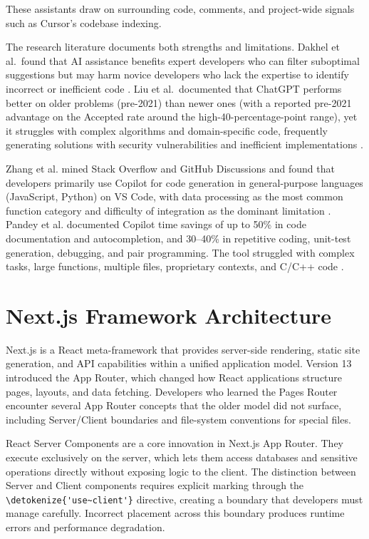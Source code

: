\documentclass[12pt,a4paper]{report}
\newcommand{\code}[1]{\texttt{\nolinkurl{\detokenize{#1}}}}
\newcommand{\usec}{\code{'use~client'}}
\begin{document}
These assistants draw on surrounding code, comments, and project-wide signals such as Cursor's codebase indexing.

The research literature documents both strengths and limitations. Dakhel et al.\ found that {AI} assistance benefits expert developers who can filter suboptimal suggestions but may harm novice developers who lack the expertise to identify incorrect or inefficient code \parencite{dakhel2023github}. Liu et al.\ documented that ChatGPT performs better on older problems (pre-2021) than newer ones (with a reported pre-2021 advantage on the Accepted rate around the high-40-percentage-point range), yet it struggles with complex algorithms and domain-specific code, frequently generating solutions with security vulnerabilities and inefficient implementations \parencite{liu2024chatgpt}.

Zhang et al. mined Stack Overflow and GitHub Discussions and found that developers primarily use Copilot for code generation in general-purpose languages (JavaScript, Python) on VS Code, with data processing as the most common function category and difficulty of integration as the dominant limitation \parencite{zhang2023practices}. Pandey et al. documented Copilot time savings of up to 50\% in code documentation and autocompletion, and 30--40\% in repetitive coding, unit-test generation, debugging, and pair programming. The tool struggled with complex tasks, large functions, multiple files, proprietary contexts, and C/C++ code \parencite{pandey2024transforming}.

\section{Next.js Framework Architecture}

Next.js is a React meta-framework that provides server-side rendering, static site generation, and API capabilities within a unified application model. Version 13 introduced the App Router, which changed how React applications structure pages, layouts, and data fetching. Developers who learned the Pages Router encounter several App Router concepts that the older model did not surface, including Server/Client boundaries and file-system conventions for special files.

React Server Components are a core innovation in Next.js App Router. They execute exclusively on the server, which lets them access databases and sensitive operations directly without exposing logic to the client. The distinction between Server and Client components requires explicit marking through the \usec{} directive, creating a boundary that developers must manage carefully. Incorrect placement across this boundary produces runtime errors and performance degradation.
\end{document}
